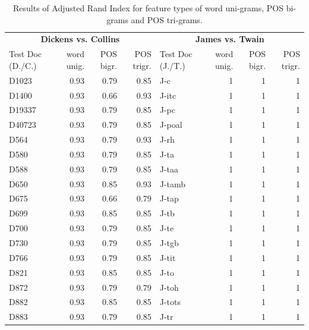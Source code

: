 \documentclass[a4paper,10pt,twoside,fleqn]{article}
\begin{document}
\begin{table}[h!]
\small 

\caption{Results of Adjusted Rand Index for feature types of word uni-grams, POS bi-grams and POS tri-grams.}
\label{tab:results-clust}
 \begin{tabular}{lrrrlrrr} \toprule[1.2pt]
  \multicolumn{4}{c}{\textbf{Dickens vs. Collins}} & \multicolumn{4}{c}{\textbf{James vs. Twain}} \\
   \cmidrule(r){1-4} 
    \cmidrule(r){5-8} 
Test Doc (D./C.) & word unig. & POS bigr. & POS trigr. & Test Doc (J./T.) & word unig. & POS bigr. & POS trigr.\\ \midrule
D1023    & 0.93 & 0.79 & 0.85 &        J-c    &    1    &    1    &    1   \\
D1400    & 0.93 & 0.66 & 0.93 &      J-itc    &    1    &    1    &    1   \\
D19337   & 0.93 & 0.79 & 0.85 &       J-pc    &    1    &    1    &    1   \\
D40723   & 0.93 & 0.79 & 0.85 &     J-poal    &    1    &    1    &    1   \\
D564     & 0.93 & 0.79 & 0.93 &       J-rh    &    1    &    1    &    1   \\
D580     & 0.93 & 0.79 & 0.85 &       J-ta    &    1    &    1    &    1   \\
D588     & 0.93 & 0.79 & 0.85 &      J-taa    &    1    &    1    &    1   \\
D650     & 0.93 & 0.85 & 0.93 &     J-tamb    &    1    &    1    &    1   \\
D675     & 0.93 & 0.66 & 0.79 &      J-tap    &    1    &    1    &    1   \\
D699     & 0.93 & 0.85 & 0.85 &       J-tb    &    1    &    1    &    1   \\
D700     & 0.93 & 0.79 & 0.85 &       J-te    &    1    &    1    &    1   \\
D730     & 0.93 & 0.79 & 0.85 &      J-tgb    &    1    &    1    &    1   \\
D766     & 0.93 & 0.79 & 0.85 &      J-tit    &    1    &    1    &    1   \\
D821     & 0.93 & 0.85 & 0.85 &       J-to    &    1    &    1    &    1   \\
D872     & 0.93 & 0.79 & 0.79 &      J-toh    &    1    &    1    &    1   \\
D882     & 0.93 & 0.85 & 0.85 &     J-tots    &    1    &    1    &    1   \\
D883     & 0.93 & 0.79 & 0.85 &       J-tr    &    1    &    1    &    1   \\

\end{tabular}
\end{table}
\end{document}
